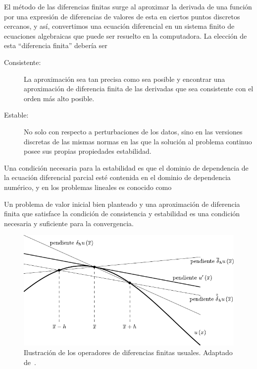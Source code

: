 El método de las diferencias finitas surge al aproximar la derivada
de una función por una expresión de diferencias de valores de esta en
ciertos puntos discretos cercanos, y así, convertimos una ecuación
diferencial en un sistema finito de ecuaciones algebraicas que puede
ser resuelto en la computadora.
La elección de esta ``diferencia finita'' debería ser

\begin{description}
    \item[Consistente:]

          La aproximación sea tan precisa como sea posible y encontrar
          una aproximación de diferencia finita de las derivadas que
          sea consistente con el orden más alto posible.

    \item[Estable:]

          No solo con respecto a perturbaciones de los datos, sino
          en las versiones discretas de las mismas normas en las que la
          solución al problema continuo posee sus propias propiedades
          estabilidad.
\end{description}

Una condición necesaria para la estabilidad es que el dominio de
dependencia de la ecuación diferencial parcial esté contenida en el
dominio de dependencia numérico, y en los problemas lineales es
conocido como

\begin{theorem}
    Un problema de valor inicial bien planteado y una aproximación de
    diferencia finita que satisface la condición de consistencia y
    estabilidad es una condición necesaria y suficiente para la
    convergencia.
\end{theorem}

\begin{figure}[ht!]
    \centering
    \includegraphics[width=.5\paperwidth]{E_IMAGENES/1_Capitulo2/finite_difference.pdf}
    \caption{
        Ilustración de los operadores de diferencias finitas usuales.
        Adaptado de~\citep{LeVeque2007}.
    }
\end{figure}

